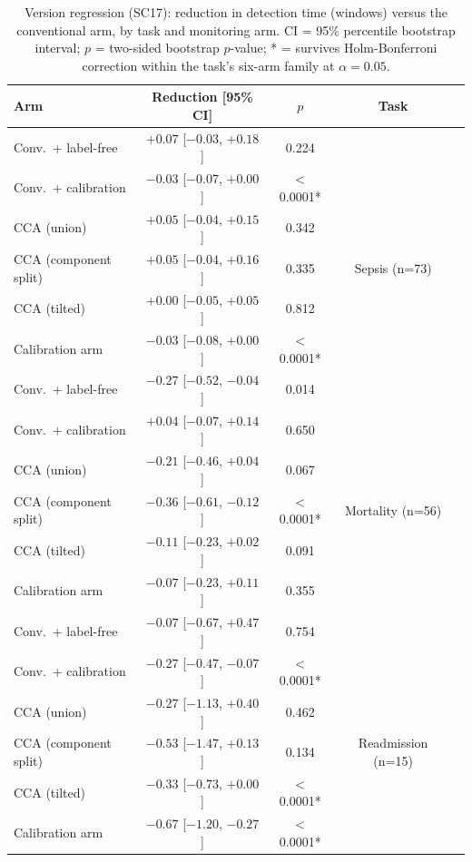 \documentclass[preprintsapa,article,submit,oneauthor]{Definitions/mdpi}
\begin{document}
\begin{table}[H]
\caption{Version regression (SC17): reduction in detection time (windows) versus the conventional arm, by task and monitoring arm. CI = 95\% percentile bootstrap interval; $p$ = two-sided bootstrap $p$-value; * = survives Holm-Bonferroni correction within the task's six-arm family at $\alpha=0.05$.\label{tab:sc17}}
\begin{tabularx}{\textwidth}{lCCCC}
\toprule
\textbf{Arm} & \textbf{Reduction [95\% CI]} & \textbf{$p$} & \textbf{Task} & \\
\midrule
Conv.\ + label-free    & $+0.07$ [$-0.03$, $+0.18$]  & 0.224 &   & \\
Conv.\ + calibration   & $-0.03$ [$-0.07$, $+0.00$]  & $<$0.0001* &  & \\
CCA (union)            & $+0.05$ [$-0.04$, $+0.15$]  & 0.342 &  & \\
CCA (component split)  & $+0.05$ [$-0.04$, $+0.16$]  & 0.335 & Sepsis (n=73) & \\
CCA (tilted)            & $+0.00$ [$-0.05$, $+0.05$]  & 0.812 &  & \\
Calibration arm        & $-0.03$ [$-0.08$, $+0.00$]  & $<$0.0001* &  & \\
\midrule
Conv.\ + label-free    & $-0.27$ [$-0.52$, $-0.04$]  & 0.014 &   & \\
Conv.\ + calibration   & $+0.04$ [$-0.07$, $+0.14$]  & 0.650 &  & \\
CCA (union)            & $-0.21$ [$-0.46$, $+0.04$]  & 0.067 &  & \\
CCA (component split)  & $-0.36$ [$-0.61$, $-0.12$]  & $<$0.0001* & Mortality (n=56) & \\
CCA (tilted)            & $-0.11$ [$-0.23$, $+0.02$]  & 0.091 &  & \\
Calibration arm        & $-0.07$ [$-0.23$, $+0.11$]  & 0.355 &  & \\
\midrule
Conv.\ + label-free    & $-0.07$ [$-0.67$, $+0.47$]  & 0.754 &   & \\
Conv.\ + calibration   & $-0.27$ [$-0.47$, $-0.07$]  & $<$0.0001* &  & \\
CCA (union)            & $-0.27$ [$-1.13$, $+0.40$]  & 0.462 &  & \\
CCA (component split)  & $-0.53$ [$-1.47$, $+0.13$]  & 0.134 & Readmission (n=15) & \\
CCA (tilted)            & $-0.33$ [$-0.73$, $+0.00$]  & $<$0.0001* &  & \\
Calibration arm        & $-0.67$ [$-1.20$, $-0.27$]  & $<$0.0001* &  & \\
\bottomrule
\end{tabularx}
\end{table}
\end{document}
